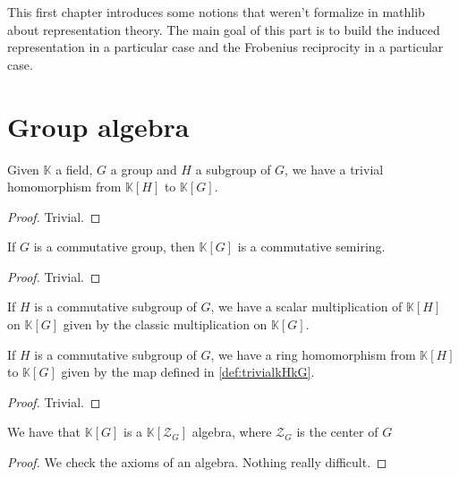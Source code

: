 This first chapter introduces some notions that weren't formalize in
mathlib about representation theory. The main goal of this part is to build
the induced representation in a particular case and the Frobenius reciprocity
in a particular case.

\section{Group algebra}

\begin{definition}
    \label{def:trivialkHkG}
    \uses{}
    \leanok
    Given $\mathbb{K}$ a field, $G$ a group and $H$ a subgroup of $G$, 
    we have a trivial homomorphism from $\mathbb{K}[H]$ to $\mathbb{K}[G]$.
    \begin{proof}
        \leanok
        Trivial.
    \end{proof}
\end{definition}


\begin{proposition}
    \label{prop:KGcommsemiring}
    \uses{}
    \leanok
    If $G$ is a commutative group, then $\mathbb{K}[G]$ is a commutative semiring.
\end{proposition}
\begin{proof}
    \leanok
    Trivial.
\end{proof}

\begin{definition}
    \label{prop:KHKGsmul}
    \leanok
    If $H$ is a commutative subgroup of $G$, we have a scalar multiplication
    of $\mathbb{K}[H]$ on $\mathbb{K}[G]$ given by the classic multiplication
    on $\mathbb{K}[G]$.
\end{definition}

\begin{definition}
    \label{def:RingHomkHkG}
    \leanok
    If $H$ is a commutative subgroup of $G$, we have a ring homomorphism
    from $\mathbb{K}[H]$ to $\mathbb{K}[G]$ given by the map defined in \ref{def:trivialkHkG}.
\end{definition}
\begin{proof}
    \leanok
    Trivial.
\end{proof}

\begin{proposition}
    \label{prop:kG_is_kGcenter_Algebra}
    \leanok
    We have that $\mathbb{K}[G]$ is a $\mathbb{K}[\mathcal{Z}_G]$
    algebra, where $\mathcal{Z}_G$ is the center of $G$
\end{proposition}
\begin{proof}
    \leanok
    We check the axioms of an algebra. Nothing really difficult.
\end{proof}

